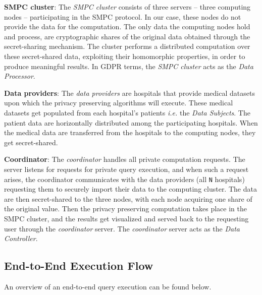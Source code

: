 \textbf{SMPC cluster}: The \textit{SMPC cluster} consists of three servers -- three computing nodes -- participating in the SMPC protocol.
In our case, these nodes do not provide the data for the computation.
The only data the computing nodes hold and process, are cryptographic shares of the original data obtained through the secret-sharing mechanism. 
The cluster performs a distributed computation over these secret\hyp shared data, exploiting their homomorphic properties, in order to produce meaningful results. 
In GDPR terms, the \textit{SMPC cluster} acts as the \textit{Data Processor}.

\textbf{Data providers}: The \textit{data providers} are hospitals that provide medical datasets upon which the privacy preserving algorithms will execute.
These medical datasets get populated from each hospital's patients \textit{i.e.} the \textit{Data Subjects}.
The patient data are horizontally distributed among the participating hospitals.
When the medical data are transferred from the hospitals to the computing nodes, they get secret\hyp shared.

\textbf{Coordinator}: The \textit{coordinator} handles all private computation requests.
The server listens for requests for private query execution, and when such a request arises, the coordinator communicates with the data providers (all \texttt{N} hospitals) requesting them to securely import their data to the computing cluster.
The data are then secret\hyp shared to the three nodes, with each node acquiring one share of the original value.
Then the privacy preserving computation takes place in the SMPC cluster, and the results get visualized and served back to the requesting user through the \textit{coordinator} server.
The \textit{coordinator} server acts as the \textit{Data Controller}.


\subsection{End-to-End Execution Flow}\label{ss:end-to-end-execution-flow}

An overview of an end\hyp to\hyp end query execution can be found below.

